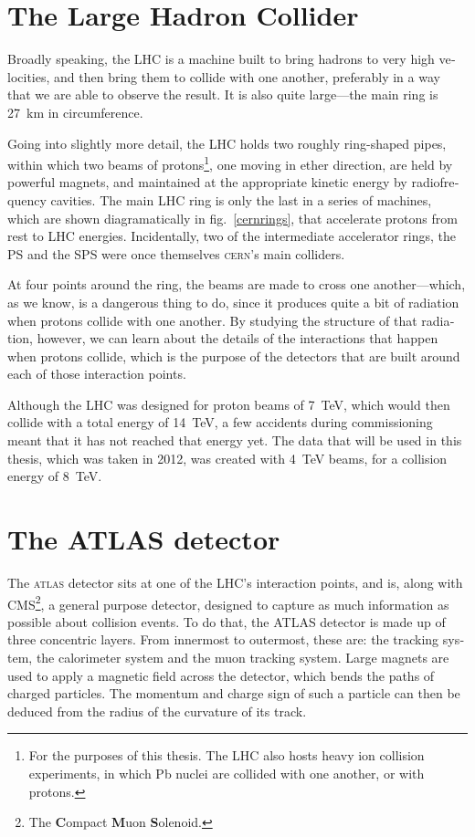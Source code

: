 \begin{english}
\section{The Large Hadron Collider}
Broadly speaking, the LHC is a machine built to bring hadrons to very high velocities, and then bring them to collide with one another, preferably in a way that we are able to observe the result. It is also quite large---the main ring is 27~km in circumference.

Going into slightly more detail, the LHC holds two roughly ring-shaped pipes, within which two beams of protons\footnote{For the purposes of this thesis. The LHC also hosts heavy ion collision experiments, in which Pb nuclei are collided with one another, or with protons.}, one moving in ether direction, are held by powerful magnets, and maintained at the appropriate kinetic energy by radiofrequency cavities. The main LHC ring is only the last in a series of machines, which are shown diagramatically in fig.~\ref{cernrings}, that accelerate protons from rest to LHC energies. Incidentally, two of the intermediate accelerator rings, the PS and the SPS were once themselves \textsc{cern}'s main colliders.

At four points around the ring, the beams are made to cross one another---which, as we know, is a dangerous thing to do, since it produces quite a bit of radiation when protons collide with one another. By studying the structure of that radiation, however, we can learn about the details of the interactions that happen when protons collide, which is the purpose of the detectors that are built around each of those interaction points.

Although the LHC was designed for proton beams of 7~TeV, which would then collide with a total energy of 14~TeV, a few accidents during commissioning meant that it has not reached that energy yet. The data that will be used in this thesis, which was taken in 2012, was created with 4~TeV beams, for a collision energy of 8~TeV.

\section{The ATLAS detector}
The \textsc{atlas} detector sits at one of the LHC's interaction points, and is, along with CMS\footnote{The \textbf{C}ompact \textbf{M}uon \textbf{S}olenoid.}, a general purpose detector, designed to capture as much information as possible about collision events. To do that, the ATLAS detector is made up of three concentric layers. From innermost to outermost, these are: the tracking system, the calorimeter system and the muon tracking system. Large magnets are used to apply a magnetic field across the detector, which bends the paths of charged particles. The momentum and charge sign of such a particle can then be deduced from the radius of the curvature of its track.


\end{english}
